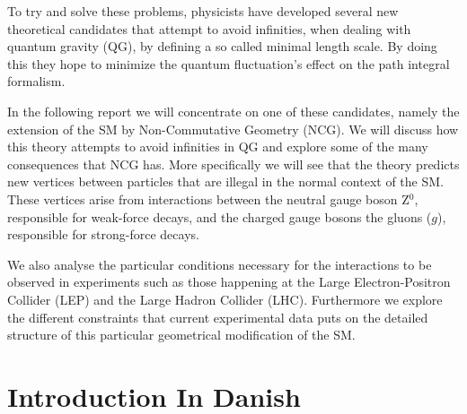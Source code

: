To try and solve these problems, physicists have developed several new theoretical candidates that attempt to avoid infinities, when dealing with quantum gravity (QG), by defining a so called minimal length scale. By doing this they hope to minimize the quantum fluctuation's effect on the path integral formalism.

In the following report we will concentrate on one of these candidates, namely the extension of the SM by Non-Commutative Geometry (NCG). We will discuss how this theory attempts to avoid infinities in QG and explore some of the many consequences that NCG has. More specifically we will see that the theory predicts new vertices between particles that are illegal in the normal context of the SM. These vertices arise from interactions between the neutral gauge boson Z$^0$, responsible for weak-force decays, and the charged gauge bosons the gluons ($g$), responsible for strong-force decays.

We also analyse the particular conditions necessary for the interactions to be observed in experiments such as those happening at the Large Electron-Positron Collider (LEP) and the Large Hadron Collider (LHC). Furthermore we explore the different constraints that current experimental data puts on the detailed structure of this particular geometrical modification of the SM.

\newpage
\section{Introduction In Danish}